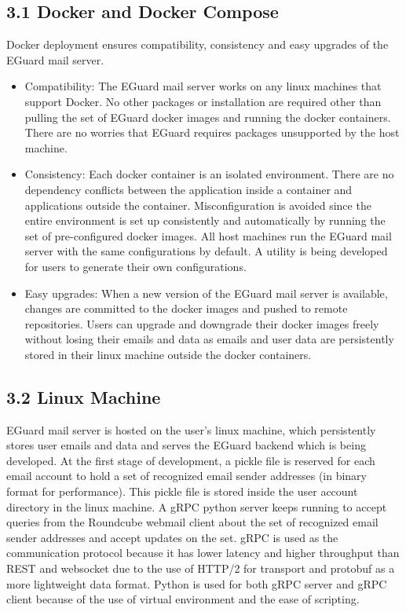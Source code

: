 \documentclass[11pt]{article}
\begin{document}
\subsection*{3.1 \hspace{10pt} Docker and Docker Compose}
Docker deployment ensures compatibility, consistency and easy upgrades of the EGuard mail server.
\begin{itemize}

\item Compatibility: The EGuard mail server works on any linux machines that support Docker. No other packages or installation are required other than pulling the set of EGuard docker images and running the docker containers. There are no worries that EGuard requires packages unsupported by the host machine.

\item Consistency: Each docker container is an isolated environment. There are no dependency conflicts between the application inside a container and applications outside the container. Misconfiguration is avoided since the entire environment is set up consistently and automatically by running the set of pre-configured docker images. All host machines run the EGuard mail server with the same configurations by default. A utility is being developed for users to generate their own configurations.

\item Easy upgrades: When a new version of the EGuard mail server is available, changes are committed to the docker images and pushed to remote repositories. Users can upgrade and downgrade their docker images freely without losing their emails and data as emails and user data are persistently stored in their linux machine outside the docker containers.

\end{itemize}



\subsection*{3.2 \hspace{10pt} Linux Machine}
EGuard mail server is hosted on the user's linux machine, which persistently stores user emails and data and serves the EGuard backend which is being developed. At the first stage of development, a pickle file is reserved for each email account to hold a set of recognized email sender addresses (in binary format for performance). This pickle file is stored inside the user account directory in the linux machine. A gRPC python server keeps running to accept queries from the Roundcube webmail client about the set of recognized email sender addresses and accept updates on the set. gRPC is used as the communication protocol because it has lower latency and higher throughput than REST and websocket due to the use of HTTP/2 for transport and protobuf as a more lightweight data format. Python is used for both gRPC server and gRPC client because of the use of virtual environment and the ease of scripting.
\end{document}
